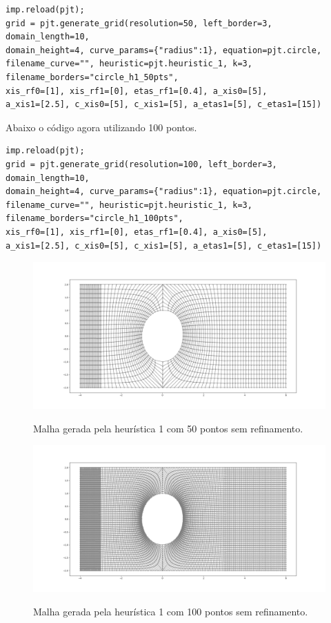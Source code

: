 \documentclass[a4paper]{article}
\begin{document}
\begin{verbatim}
imp.reload(pjt);  
grid = pjt.generate_grid(resolution=50, left_border=3, domain_length=10, 
domain_height=4, curve_params={"radius":1}, equation=pjt.circle, 
filename_curve="", heuristic=pjt.heuristic_1, k=3, filename_borders="circle_h1_50pts", 
xis_rf0=[1], xis_rf1=[0], etas_rf1=[0.4], a_xis0=[5], 
a_xis1=[2.5], c_xis0=[5], c_xis1=[5], a_etas1=[5], c_etas1=[15])
\end{verbatim}

Abaixo o código agora utilizando 100 pontos.
\begin{verbatim}
imp.reload(pjt);  
grid = pjt.generate_grid(resolution=100, left_border=3, domain_length=10, 
domain_height=4, curve_params={"radius":1}, equation=pjt.circle, 
filename_curve="", heuristic=pjt.heuristic_1, k=3, filename_borders="circle_h1_100pts", 
xis_rf0=[1], xis_rf1=[0], etas_rf1=[0.4], a_xis0=[5], 
a_xis1=[2.5], c_xis0=[5], c_xis1=[5], a_etas1=[5], c_etas1=[15])
\end{verbatim}


\begin{figure}[H]
	\centering
	\includegraphics[width=1.0\textwidth]{heuristica_1_50pts.png}
	\label{fig:heuristic1_50pts} 
	\caption[caption]{Malha gerada pela heurística 1 com 50 pontos sem refinamento.}
\end{figure}

\begin{figure}[H]
	\centering
	\includegraphics[width=1.0\textwidth]{heuristica_1_100pts.png}
	\label{fig:heuristic1_100pts} 
	\caption[caption]{Malha gerada pela heurística 1 com 100 pontos sem refinamento.}
\end{figure}
\end{document}
